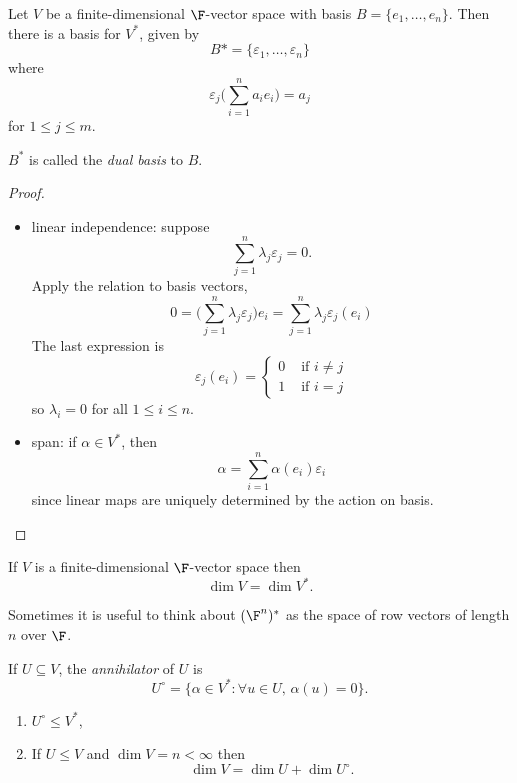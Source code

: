 \documentclass[a4paper]{article}
\newcommand*{\ann}{\circ}
\theoremstyle{definition}
\begin{document}
\begin{lem}
  Let \(V\) be a finite-dimensional \(\F\)-vector space with basis \(B = \{e_1,\dots,e_n\}\). Then there is a basis for \(V^*\), given by
  \[
    B* = \{\varepsilon_1,\dots, \varepsilon_n\}
  \]
  where
  \[
    \varepsilon_j \Big( \sum_{i=1}^{n} a_i e_i \Big) = a_j
  \]
  for \(1\leq j\leq m\).

  \(B^*\) is called the \emph{dual basis} to \(B\).
\end{lem}

\begin{proof}\leavevmode
  \begin{itemize}
  \item linear independence: suppose
    \[
      \sum_{j=1}^{n}\lambda_j\varepsilon_j = 0.
    \]
    Apply the relation to basis vectors,
    \[
      0 = \Big( \sum_{j=1}^n \lambda_j\varepsilon_j \Big) e_i = \sum_{j=1}^n \lambda_j\varepsilon_j(e_i)
      \]
      The last expression is 
      \[
        \varepsilon_j(e_i) = 
      \begin{cases}
        0 & \text{ if } i \neq j \\
        1 & \text{ if } i = j
      \end{cases}
    \]
    so \(\lambda_i=0\) for all \(1 \leq i \leq n\).
  \item span: if \(\alpha \in V^*\), then
    \[
      \alpha = \sum_{i=1}^{n}\alpha(e_i)\varepsilon_i
    \]
    since linear maps are uniquely determined by the action on basis.
  \end{itemize}
\end{proof}

\begin{cor}
  If \(V\) is a finite-dimensional \(\F\)-vector space then
  \[
    \dim V = \dim V^*.
  \]
\end{cor}

\begin{rmk}
  Sometimes it is useful to think about \((\F^n)^*\) as the space of row vectors of length \(n\) over \(\F\).
\end{rmk}

\begin{defi}[Annihilator]
  If \(U \subseteq V\), the \emph{annihilator} of \(U\) is
  \[
    U^\ann = \{\alpha\in V^*: \forall u \in U,\,\alpha(u) = 0 \}.
  \]
\end{defi}

\begin{lem}\leavevmode
  \begin{enumerate}
  \item \(U^\ann \leq V^*\),
  \item If \(U \leq V\) and \(\dim V = n < \infty\) then
    \[
      \dim V = \dim U + \dim U^\ann.
    \]
  \end{enumerate}
\end{lem}
\end{document}
